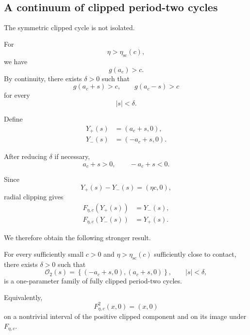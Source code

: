 \subsection{A continuum of clipped period-two cycles}
\label{subsec:continuum-clipped-cycles}

The symmetric clipped cycle is not isolated.

For
\[
\eta>\eta_{\mathrm{sc}}(c),
\]
we have
\[
g(a_c)>c.
\]
By continuity, there exists $\delta>0$ such that
\begin{equation}
g(a_c+s)>c,
\qquad
g(a_c-s)>c
\label{eq:clipped-neighborhood-condition}
\end{equation}
for every
\[
|s|<\delta.
\]

Define
\begin{align}
Y_+(s)
&=
(a_c+s,0),
\label{eq:Y-plus-s}
\\
Y_-(s)
&=
(-a_c+s,0).
\label{eq:Y-minus-s}
\end{align}

After reducing $\delta$ if necessary,
\[
a_c+s>0,
\qquad
-a_c+s<0.
\]

Since
\[
Y_+(s)-Y_-(s)
=
(\eta c,0),
\]
radial clipping gives
\begin{align}
F_{\eta,c}(Y_+(s))
&=
Y_-(s),
\label{eq:family-forward}
\\
F_{\eta,c}(Y_-(s))
&=
Y_+(s).
\label{eq:family-backward}
\end{align}

We therefore obtain the following stronger result.

\begin{theorem}
\label{thm:family-clipped-cycles}
For every sufficiently small $c>0$ and
$\eta>\eta_{\mathrm{sc}}(c)$ sufficiently close to contact, there
exists $\delta>0$ such that
\begin{equation}
\mathcal O_2(s)
=
\left\{
(-a_c+s,0),
(a_c+s,0)
\right\},
\qquad
|s|<\delta,
\label{eq:period-two-family}
\end{equation}
is a one-parameter family of fully clipped period-two cycles.

Equivalently,
\begin{equation}
F_{\eta,c}^2(x,0)
=
(x,0)
\label{eq:F2-identity-axis}
\end{equation}
on a nontrivial interval of the positive clipped component and on
its image under $F_{\eta,c}$.
\end{theorem}

